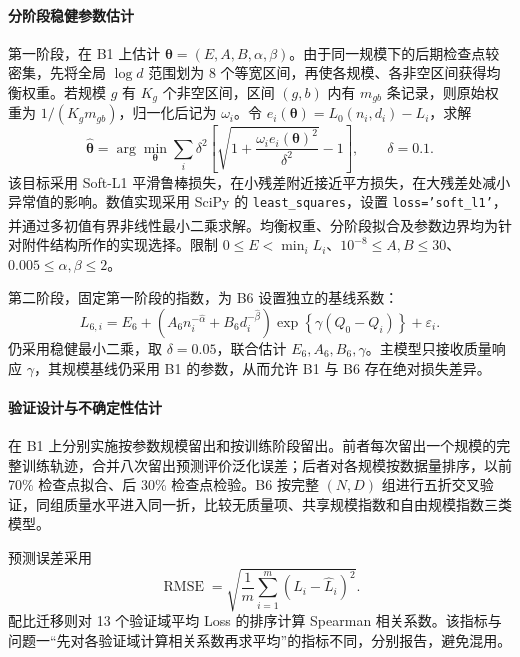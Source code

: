 \documentclass[bwprint]{gmcmthesis}
\numberwithin{equation}{section}
\numberwithin{figure}{section}
\numberwithin{table}{section}
\begin{document}
        \paragraph{分阶段稳健参数估计}
        第一阶段，在 B1 上估计 $\bm\theta=(E,A,B,\alpha,\beta)$。由于同一规模下的后期检查点较密集，先将全局 $\log d$ 范围划为 8 个等宽区间，再使各规模、各非空区间获得均衡权重。若规模 $g$ 有 $K_g$ 个非空区间，区间 $(g,b)$ 内有 $m_{gb}$ 条记录，则原始权重为 $1/(K_gm_{gb})$，归一化后记为 $\omega_i$。令 $e_i(\bm\theta)=L_0(n_i,d_i)-L_i$，求解
        \begin{equation}
         \widehat{\bm\theta}=\arg\min_{\bm\theta}
         \sum_i\delta^2\left[\sqrt{1+\frac{\omega_i e_i(\bm\theta)^2}{\delta^2}}-1\right],
         \qquad \delta=0.1.
         \label{eq:p2_fit}
        \end{equation}
        该目标采用 Soft-L1 平滑鲁棒损失，在小残差附近接近平方损失，在大残差处减小异常值的影响。数值实现采用 SciPy 的 \texttt{least\_squares}，设置 \texttt{loss='soft\_l1'}，并通过多初值有界非线性最小二乘求解\textsuperscript{\cite{virtanen2020scipy}}。均衡权重、分阶段拟合及参数边界均为针对附件结构所作的实现选择。限制 $0\leq E<\min_iL_i$、$10^{-8}\leq A,B\leq30$、$0.005\leq\alpha,\beta\leq2$。
        
        第二阶段，固定第一阶段的指数，为 B6 设置独立的基线系数：
        \begin{equation}
         L_{6,i}=E_6+\left(A_6n_i^{-\widehat\alpha}+B_6d_i^{-\widehat\beta}\right)
         \exp\!\left\{\gamma(Q_0-Q_i)\right\}+\varepsilon_i.
         \label{eq:p2_fit_quality}
        \end{equation}
        仍采用稳健最小二乘，取 $\delta=0.05$，联合估计 $E_6,A_6,B_6,\gamma$。主模型只接收质量响应 $\gamma$，其规模基线仍采用 B1 的参数，从而允许 B1 与 B6 存在绝对损失差异。
    
        \paragraph{验证设计与不确定性估计}
        在 B1 上分别实施按参数规模留出和按训练阶段留出。前者每次留出一个规模的完整训练轨迹，合并八次留出预测评价泛化误差；后者对各规模按数据量排序，以前 70\% 检查点拟合、后 30\% 检查点检验。B6 按完整 $(N,D)$ 组进行五折交叉验证，同组质量水平进入同一折，比较无质量项、共享规模指数和自由规模指数三类模型。
        
        预测误差采用
        \begin{equation}
         \operatorname{RMSE}=\sqrt{\frac1m\sum_{i=1}^{m}(L_i-\widehat L_i)^2}.
         \label{eq:p2_rmse}
        \end{equation}
        配比迁移则对 13 个验证域平均 Loss 的排序计算 Spearman 相关系数。该指标与问题一“先对各验证域计算相关系数再求平均”的指标不同，分别报告，避免混用。
        
\end{document}
